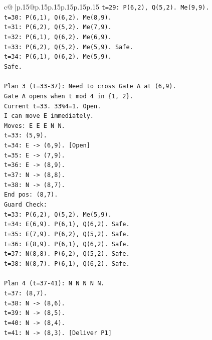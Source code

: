 \documentclass{article}
\begin{document}
{\begin{supertabular}{c@{$\;$}|p{.15\linewidth}@{}p{.15\linewidth}p{.15\linewidth}p{.15\linewidth}p{.15\linewidth}p{.15\linewidth}}
{{{\texttt{t=29: P(6,2), Q(5,2). Me(9,9).} \\
\texttt{t=30: P(6,1), Q(6,2). Me(8,9).} \\
\texttt{t=31: P(6,2), Q(5,2). Me(7,9).} \\
\texttt{t=32: P(6,1), Q(6,2). Me(6,9).} \\
\texttt{t=33: P(6,2), Q(5,2). Me(5,9). Safe.} \\
\texttt{t=34: P(6,1), Q(6,2). Me(5,9).} \\
\texttt{Safe.} \\
\\ 
\texttt{Plan 3 (t=33{-}37): Need to cross Gate A at (6,9).} \\
\texttt{Gate A opens when t mod 4 in \{1, 2\}.} \\
\texttt{Current t=33. 33\%4=1. Open.} \\
\texttt{I can move E immediately.} \\
\texttt{Moves: E E E N N.} \\
\texttt{t=33: (5,9).} \\
\texttt{t=34: E {-}> (6,9). {[}Open{]}} \\
\texttt{t=35: E {-}> (7,9).} \\
\texttt{t=36: E {-}> (8,9).} \\
\texttt{t=37: N {-}> (8,8).} \\
\texttt{t=38: N {-}> (8,7).} \\
\texttt{End pos: (8,7).} \\
\texttt{Guard Check:} \\
\texttt{t=33: P(6,2), Q(5,2). Me(5,9).} \\
\texttt{t=34: E(6,9). P(6,1), Q(6,2). Safe.} \\
\texttt{t=35: E(7,9). P(6,2), Q(5,2). Safe.} \\
\texttt{t=36: E(8,9). P(6,1), Q(6,2). Safe.} \\
\texttt{t=37: N(8,8). P(6,2), Q(5,2). Safe.} \\
\texttt{t=38: N(8,7). P(6,1), Q(6,2). Safe.} \\
\\ 
\texttt{Plan 4 (t=37{-}41): N N N N N.} \\
\texttt{t=37: (8,7).} \\
\texttt{t=38: N {-}> (8,6).} \\
\texttt{t=39: N {-}> (8,5).} \\
\texttt{t=40: N {-}> (8,4).} \\
\texttt{t=41: N {-}> (8,3). {[}Deliver P1{]}} \\
}}}
\end{supertabular}}
\end{document}

